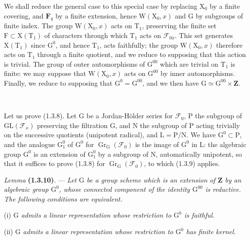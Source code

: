 \documentclass[11pt,leqno]{article}
\newcommand{\Page}[1]{\ifvmode\noindent\else\unskip\ \fi{\footnotesize\textcolor{gray}{[p.\,#1]}}\ \ignorespaces}
\begin{document}
We shall reduce the general case to this special case by replacing \(\mathrm{X}_0\) by a finite covering, and \(\mathbf{F}_q\) by a finite extension, hence \(\mathrm{W}(\mathrm{X}_0,x)\) and \(\mathrm{G}\) by subgroups of finite index. The group \(\mathrm{W}(\mathrm{X}_0,x)\) acts on \(\mathrm{T}_1\), preserving the finite set \(\mathrm{F}\subset\mathrm{X}(\mathrm{T}_1)\) of characters through which \(\mathrm{T}_1\) acts on \(\mathscr{F}_{0\bar{x}}\). This set generates \(\mathrm{X}(\mathrm{T}_1)\) since \(\mathrm{G}^0\), and hence \(\mathrm{T}_1\), acts faithfully; the group \(\mathrm{W}(\mathrm{X}_0,x)\) therefore acts on \(\mathrm{T}_1\) through a finite quotient, and we reduce to supposing that this action is trivial. The group of outer automorphisms of \(\mathrm{G}^{00}\) which are trivial on \(\mathrm{T}_1\) is finite: we may suppose that \(\mathrm{W}(\mathrm{X}_0,x)\) acts on \(\mathrm{G}^{00}\) by inner automorphisms. Finally, we reduce to supposing that \(\mathrm{G}^0=\mathrm{G}^{00}\), and we then have \(\mathrm{G}\simeq\mathrm{G}^{00}\times\mathbf{Z}\).

\Page{160}

Let us prove (1.3.8). Let \(\mathrm{G}\) be a Jordan-Hölder series for \(\mathscr{F}_0\), \(\mathrm{P}\) the subgroup of \(\mathrm{GL}(\mathscr{F}_x)\) preserving the filtration \(\mathrm{G}\), and \(\mathrm{N}\) the subgroup of \(\mathrm{P}\) acting trivially on the successive quotients (unipotent radical), and \(\mathrm{L}=\mathrm{P}/\mathrm{N}\). We have \(\mathrm{G}^0\subset\mathrm{P}\), and the analogue \(\mathrm{G}_1^0\) of \(\mathrm{G}^0\) for \(\operatorname{Gr}_{\mathrm{G}}(\mathscr{F}_0)\) is the image of \(\mathrm{G}^0\) in \(\mathrm{L}\): the algebraic group \(\mathrm{G}^0\) is an extension of \(\mathrm{G}_1^0\) by a subgroup of \(\mathrm{N}\), automatically unipotent, so that it suffices to prove (1.3.8) for \(\operatorname{Gr}_{\mathrm{G}}(\mathscr{F}_0)\), to which (1.3.9) applies.

\textit{Lemma} \textbf{(1.3.10)}. — \textit{Let \(\mathrm{G}\) be a group scheme which is an extension of \(\mathbf{Z}\) by an algebraic group \(\mathrm{G}^0\), whose connected component of the identity \(\mathrm{G}^{00}\) is reductive. The following conditions are equivalent.}

(i) \textit{\(\mathrm{G}\) admits a linear representation whose restriction to \(\mathrm{G}^0\) is faithful.}

(ii) \textit{\(\mathrm{G}\) admits a linear representation whose restriction to \(\mathrm{G}^0\) has finite kernel.}
\end{document}
